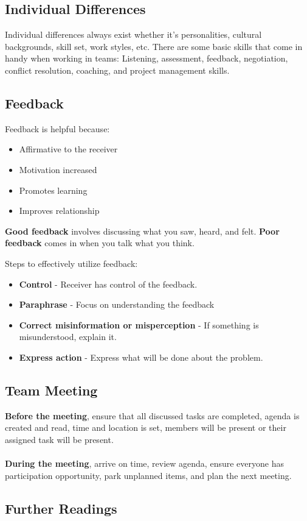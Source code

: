 \documentclass[english, 12pt]{article}
\begin{document}
\subsection{Individual Differences}
Individual differences always exist whether it's personalities, cultural backgrounds, skill set, work styles, etc. There are some basic skills that come in handy when working in teams: Listening, assessment, feedback, negotiation, conflict resolution, coaching, and project management skills.
\subsection{Feedback}
Feedback is helpful because:
\begin{itemize}
\item Affirmative to the receiver
\item Motivation increased
\item Promotes learning
\item Improves relationship
\end{itemize}
\begin{note}
\textbf{Good feedback} involves discussing what you saw, heard, and felt. \textbf{Poor feedback} comes in when you talk what you think.
\end{note}
Steps to effectively utilize feedback:
\begin{itemize}
\item \textbf{Control} - Receiver has control of the feedback.
\item \textbf{Paraphrase} - Focus on understanding the feedback
\item \textbf{Correct misinformation or misperception} - If something is misunderstood, explain it.
\item \textbf{Express action} - Express what will be done about the problem.
\end{itemize}
\subsection{Team Meeting}
\textbf{Before the meeting}, ensure that all discussed tasks are completed, agenda is created and read, time and location is set, members will be present or their assigned task will be present.\\\\
\textbf{During the meeting}, arrive on time, review agenda, ensure everyone has participation opportunity, park unplanned items, and plan the next meeting.
\subsection*{Further Readings}
\end{document}
